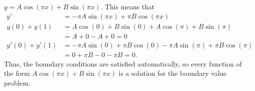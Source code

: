 \documentclass[a4paper]{amsart}
\begin{document}
\begin{solution}
\begin{itemize}
   $y=A\cos(\pi x)+B\sin(\pi x)$.  This means that
   \begin{align*}
    y' &= -\pi A\sin(\pi x)+\pi B\cos(\pi x) \\
    y(0) + y(1) &= A\cos(0)+B\sin(0)+A\cos(\pi)+B\sin(\pi) \\
                &= A+0-A+0=0\\
    y'(0)+y'(1) &= -\pi A\sin(0)+\pi B\cos(0)-\pi A\sin(\pi)+\pi B\cos(\pi)\\
                &= 0+\pi B-0-\pi B=0.
   \end{align*}
   Thus, the boundary conditions are satisfied automatically, so
   every function of the form $A\cos(\pi x)+B\sin(\pi x)$ is a
   solution for the boundary value problem.
 \end{itemize}
\end{solution}
\end{document}
